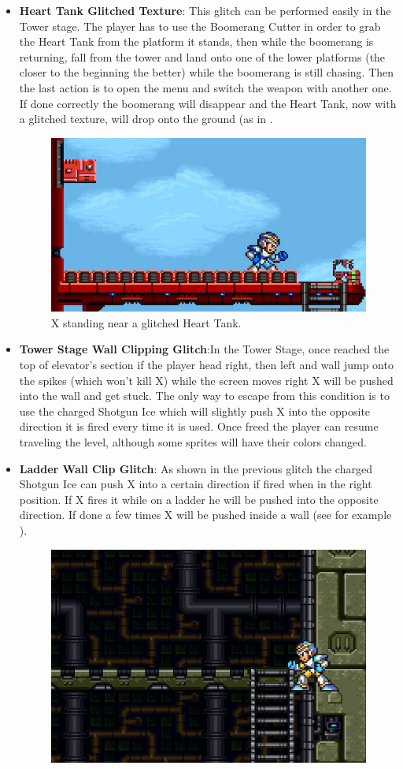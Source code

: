 \begin{itemize}
	\item \textbf{Heart Tank Glitched Texture}: This glitch can be performed easily in the Tower stage. The player has to use the Boomerang Cutter in order to grab the Heart Tank from the platform it stands, then while the boomerang is returning, fall from the tower and land onto one of the lower platforms (the closer to the beginning the better) while the boomerang is still chasing. Then the last action is to open the menu and switch the weapon with another one. If done correctly the boomerang will disappear and the Heart Tank, now with a glitched texture, will drop onto the ground (as in .
	\begin{figure}[htp]
		\centering
		\includegraphics[width=0.5\linewidth]{figures/X1/Miscs/Tower_glitched_heart.jpg}
		\caption{X standing near a glitched Heart Tank.}
	\end{figure}
	\item \textbf{Tower Stage Wall Clipping Glitch}:In the Tower Stage, once reached the top of elevator's section if the player head right, then left and wall jump onto the spikes (which won't kill X) while the screen moves right X will be pushed into the wall and get stuck. The only way to escape from this condition is to use the charged Shotgun Ice which will slightly push X into the opposite direction it is fired every time it is used. Once freed the player can resume traveling the level, although some sprites will have their colors changed.
	\item \textbf{Ladder Wall Clip Glitch}: As shown in the previous glitch the charged Shotgun Ice can push X into a certain direction if fired when in the right position. If X fires it while on a ladder he will be pushed into the opposite direction. If done a few times X will be pushed inside a wall (see for example ).
	\begin{figure}[htp]
		\centering
		\includegraphics[width=0.5\linewidth]{figures/X1/Miscs/Wall_clipping.jpg}

\end{figure}
\end{itemize}
